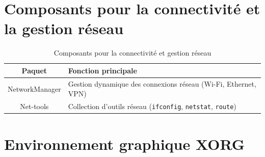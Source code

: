 


\section{Composants pour la connectivité et la gestion réseau} 

\begin{table}[H]
    \centering
    \begin{tabular}{|c|p{8cm}|}
        \hline
        \textbf{Paquet}  & \textbf{Fonction principale} \\
        \hline
        NetworkManager  & Gestion dynamique des connexions réseau (Wi-Fi, Ethernet, VPN)  \\
        \hline
       
        Net-tools  & Collection d'outils réseau  (\texttt{ifconfig}, \texttt{netstat}, \texttt{route}) \\
        \hline
    \end{tabular}
    \caption{Composants pour la connectivité et gestion réseau}
    \label{tab:network}
\end{table}



\section{Environnement graphique XORG}

